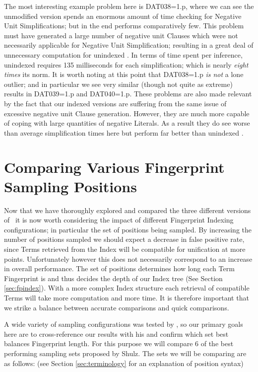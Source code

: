 The most interesting example problem here is DAT038=1.p, where we can see the unmodified
version spends an enormous amount of time checking for Negative Unit Simplifications;
but in the end performs comparatively few. This problem must have generated a large
number of negative unit Clauses which were not necessarily applicable for
Negative Unit Simplification; resulting in a great deal of unnecessary computation
for unindexed \beagle. In terms of time spent per inference, 
unindexed \beagle requires 135 milliseconds for each simplification;
which is nearly \emph{eight times} its norm. It is worth noting at this point that DAT038=1.p \emph{is not} a lone outlier; and
in particular we see very similar (though not quite as extreme) results in DAT039=1.p and DAT040=1.p.
These problems are also made relevant by the fact that our indexed versions are suffering
from the same issue of excessive negative unit Clause generation.
However, they are much more capable of coping with large quantities of negative Literals.
As a result they do see worse than average simplification times here but perform
far better than unindexed \beagle. 

\section{Comparing Various Fingerprint Sampling Positions}
\label{sec:fingcomp}

Now that we have thoroughly explored and compared the three different versions of
\beagle\ it is now worth considering the impact of different Fingerprint Indexing
configurations; in particular the set of positions being sampled. 
By increasing the number of positions sampled we should
expect a decrease in false positive rate, since Terms retrieved from the Index will
be compatible for unification at more points. Unfortunately however this does
not necessarily correspond to an increase in overall performance.
The set of positions determines how long each Term Fingerprint is and thus decides the depth of our Index
tree (See Section \ref{sec:fpindex}). With a more complex Index structure each
retrieval of compatible Terms will take more computation and more time. It is
therefore important that we strike a balance between accurate comparisons and
quick comparisons.

\pagebreak

A wide variety
of sampling configurations was tested by , so our primary goals
here are to cross-reference our results with his and confirm which set best balances Fingerprint length.
For this purpose we will compare 6 of the best performing sampling sets proposed by
Shulz. The sets we will be comparing are as follows: (see Section \ref{sec:terminology}
for an explanation of position syntax)

